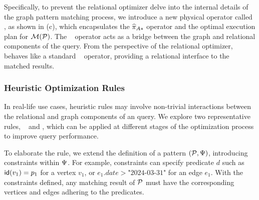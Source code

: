 
Specifically, to prevent the relational optimizer delve into the internal details of the graph pattern matching process, we introduce a new physical operator called \scangraphtable, as shown in (c), which encapsulates the $\widehat{\pi}_{A*}$ operator and the optimal execution plan for $\mathcal{M}(\mathcal{P})$.
The \scangraphtable~ operator acts as a bridge between the graph and relational components of the query. From the perspective of the relational optimizer, \scangraphtable~ behaves like a standard \scan~ operator, providing a relational interface to the matched results. %

\subsubsection{Heuristic Optimization Rules}
In real-life use cases, heuristic rules may involve non-trivial interactions between the relational and graph components of an \spjm query. We explore two representative rules, \filterrule~ and \joinfuserule, which can be applied at different stages of the optimization process to improve query performance.


 To elaborate the rule, we extend the definition of a pattern $(\mathcal{P}, \Psi)$, introducing constraints within $\Psi$. For example, constraints can specify predicate $d$ such as ${\mathsf{id}}(v_1) = p_1$ for a vertex $v_1$, or $e_1.date > \text{"2024-03-31"}$ for an edge $e_1$. With the constraints defined, any matching result of $\mathcal{P}$ must have the corresponding vertices and edges adhering to the predicates.


